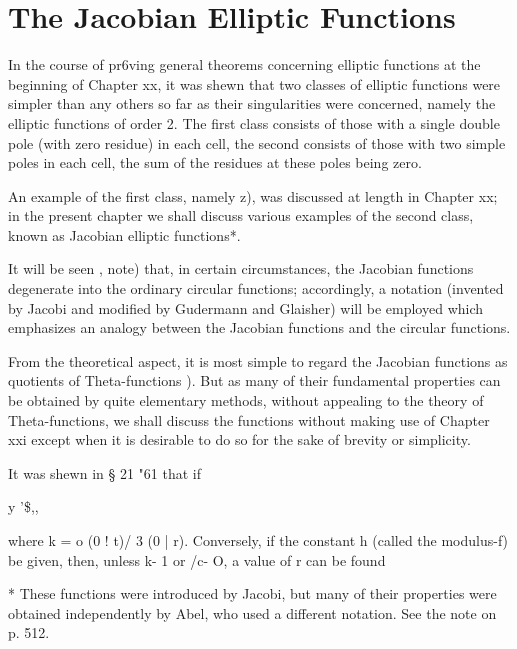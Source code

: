 %
%
\chapter{The Jacobian Elliptic Functions} 


In the course of pr6ving general theorems concerning elliptic
functions at the beginning of Chapter xx, it was shewn that two
classes of elliptic functions were simpler than any others so far as
their singularities were concerned, namely the elliptic functions of
order 2. The first class consists of those with a single double pole
(with zero residue) in each cell, the second consists of those with
two simple poles in each cell, the sum of the residues at these poles
being zero.

An example of the first class, namely z), was discussed at length in
Chapter xx; in the present chapter we shall discuss various examples
of the second class, known as Jacobian elliptic functions*.

It will be seen , note) that, in certain circumstances, the
Jacobian functions degenerate into the ordinary circular functions;
accordingly, a notation (invented by Jacobi and modified by Gudermann
and Glaisher) will be employed which emphasizes an analogy between the
Jacobian functions and the circular functions.

From the theoretical aspect, it is most simple to regard the Jacobian
functions as quotients of Theta-functions ). But as many of
their fundamental properties can be obtained by quite elementary
methods, without appealing to the theory of Theta-functions, we shall
discuss the functions without making use of Chapter xxi except when it
is desirable to do so for the sake of brevity or simplicity.

It was shewn in
§ 21 "61 that if

y '\$,,%

where k = o (0 ! t)/ 3 (0 | r). Conversely, if the constant h (called
the modulus-f) be given, then, unless k- 1 or /c- O, a value of r can
be found

* These functions were introduced by Jacobi, but many of their
properties were obtained independently by Abel, who used a different
notation. See the note on p. 512.

